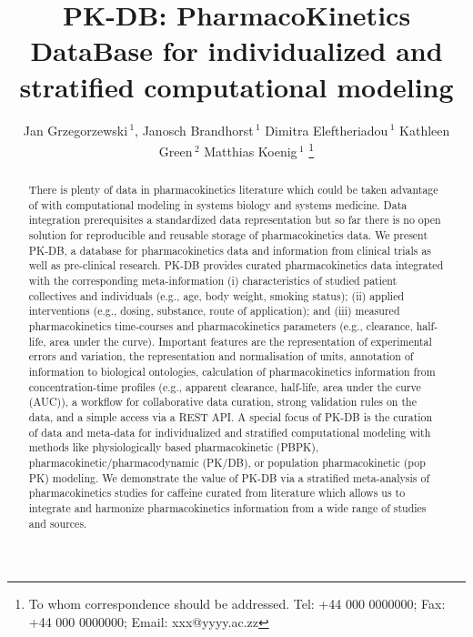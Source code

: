\documentclass[a4,center,fleqn]{NAR}
\begin{document}
\title{PK-DB: PharmacoKinetics DataBase for individualized and stratified computational modeling}

\author{%
Jan Grzegorzewski\,$^{1}$,
Janosch Brandhorst\,$^{1}$
Dimitra Eleftheriadou\,$^{1}$
Kathleen Green\,$^{2}$
Matthias Koenig\,$^{1}$%
\footnote{To whom correspondence should be addressed.
Tel: +44 000 0000000; Fax: +44 000 0000000; Email: xxx@yyyy.ac.zz}}

\address{%
$^{1}$Institute for Theoretical Biology, Humboldt University Berlin, Berlin, Germany
and
$^{2}$Department of Biochemistry, Stellenbosch University, Stellenbosch, South Africa}


\maketitle

\begin{abstract}
  There is plenty of data in pharmacokinetics literature which could be taken advantage of with computational modeling in systems biology and systems medicine. Data integration prerequisites a standardized data representation but so far there is no open solution for reproducible and reusable storage of pharmacokinetics data. We present PK-DB, a database for pharmacokinetics data and information from clinical trials as well as pre-clinical research. PK-DB provides curated pharmacokinetics data integrated with the corresponding meta-information (i) characteristics of studied patient collectives and individuals (e.g., age, body weight, smoking status); (ii) applied interventions (e.g., dosing, substance, route of application); and (iii) measured pharmacokinetics time-courses and pharmacokinetics parameters (e.g., clearance, half-life, area under the curve). Important features are the representation of experimental errors and variation, the representation and normalisation of units, annotation of information to biological ontologies, calculation of pharmacokinetics information from concentration-time profiles (e.g., apparent clearance, half-life, area under the curve (AUC)), a workflow for collaborative data curation, strong validation rules on the data, and a simple access via a REST API. A special focus of PK-DB is the curation of data and meta-data for individualized and stratified computational modeling with methods like physiologically based pharmacokinetic (PBPK), pharmacokinetic/pharmacodynamic (PK/DB), or population pharmacokinetic (pop PK) modeling. We demonstrate the value of PK-DB via a stratified meta-analysis of pharmacokinetics studies for caffeine curated from literature which allows us to integrate and harmonize pharmacokinetics information from a wide range of studies and sources.
\end{abstract}
\end{document}
